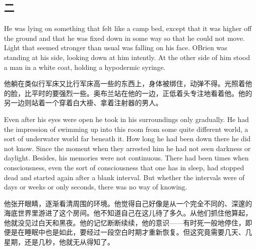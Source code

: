 \begin{paracol}{2}
\switchcolumn

\section*{二}\label{ux4e8cux5341}

\switchcolumn*

He was lying on something that felt like a camp bed, except that it was
higher off the ground and that he was fixed down in some way so that he
could not move. Light that seemed stronger than usual was falling on his
face. O\textquotesingle Brien was standing at his side, looking down at
him intently. At the other side of him stood a man in a white coat,
holding a hypodermic syringe.

\switchcolumn

他躺在类似行军床又比行军床高一些的东西上，身体被绑住，动弹不得。光照着他的脸，比平时的要强烈一些。奥布兰站在他的一边，正低着头专注地看着他。他的另一边则站着一个穿着白大褂、拿着注射器的男人。

\switchcolumn*

Even after his eyes were open he took in his surroundings only
gradually. He had the impression of swimming up into this room from some
quite different world, a sort of underwater world far beneath it. How
long he had been down there he did not know. Since the moment when they
arrested him he had not seen darkness or daylight. Besides, his memories
were not continuous. There had been times when consciousness, even the
sort of consciousness that one has in sleep, had stopped dead and
started again after a blank interval. But whether the intervals were of
days or weeks or only seconds, there was no way of knowing.

\switchcolumn

他张开眼睛，逐渐看清周围的环境。他觉得自己好像是从一个完全不同的、深邃的海底世界里游进了这个房间。他不知道自己在这儿待了多久。从他们抓住他算起，他就没见过白天和黑夜。他的记忆断断续续，他的意识——有时死一般地停住，即便是在睡眠中也是如此，要经过一段空白时期才重新恢复。但这究竟需要几天、几星期，还是几秒，他就无从得知了。

\switchcolumn*


\end{paracol}
